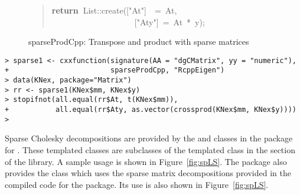 \documentclass[shortnames,article]{jss}
\newcommand{\hlstd}[1]{\textcolor[rgb]{0,0,0}{#1}}
\newcommand{\hlopt}[1]{\textcolor[rgb]{0,0,0}{#1}}
\newcommand{\hlstr}[1]{\textcolor[rgb]{0.90,0.15,0.15}{#1}}
\newcommand{\hlkwa}[1]{\textcolor[rgb]{0.61,0.13,0.93}{\bf{#1}}}
\newcommand{\hlkwd}[1]{\textcolor[rgb]{0,0,0}{#1}}
\begin{document}
\begin{figure}[htb]
\begin{quote}
    \hlstd{}\hlkwa{return\ }\hlstd{List}\hlopt{::}\hlstd{}\hlkwd{create}\hlstd{}\hlopt{(}\hlstd{\textunderscore }\hlopt{{[}}\hlstd{}\hlstr{"At"}\hlstd{}\hlopt{{]}}\hlstd{\ \ }\hlopt{=\ }\hlstd{At}\hlopt{,}\hspace*{\fill}\\
    \hlstd{}\hlstd{\ \ \ \ \ \ \ \ \ \ \ \ \ \ \ \ \ \ \ \ }\hlstd{\textunderscore }\hlopt{{[}}\hlstd{}\hlstr{"Aty"}\hlstd{}\hlopt{{]}\ =\ }\hlstd{At\ }\hlopt{{*}\ }\hlstd{y}\hlopt{);}\hlstd{}\hspace*{\fill}
    \normalfont
    \normalsize
    \caption{sparseProdCpp: Transpose and product with sparse matrices}
    \label{sparseProd}
  \end{quote}
\end{figure}

\begin{verbatim}
> sparse1 <- cxxfunction(signature(AA = "dgCMatrix", yy = "numeric"),
+                        sparseProdCpp, "RcppEigen")
> data(KNex, package="Matrix")
> rr <- sparse1(KNex$mm, KNex$y)
> stopifnot(all.equal(rr$At, t(KNex$mm)),
+           all.equal(rr$Aty, as.vector(crossprod(KNex$mm, KNex$y))))
> 
\end{verbatim}

Sparse Cholesky decompositions are provided by the
 and  classes in the
 package for .  These templated classes are
subclasses of the  templated class in the
 section of the  library.  A sample usage
is shown in Figure~\ref{fig:spLS}.  The  package also
provides the  class which uses the
 sparse matrix decompositions provided in the compiled
code for the  package.  Its use is also shown in
Figure~\ref{fig:spLS}.

\end{document}
